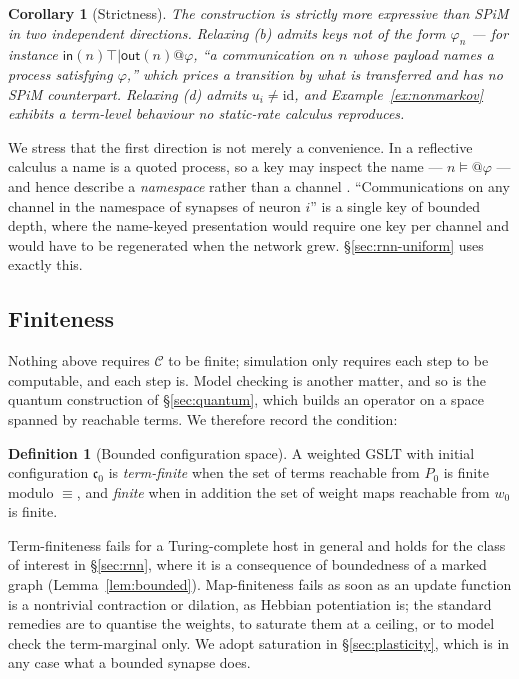 \documentclass[11pt,a4paper]{article}
\theoremstyle{plain}
\newtheorem{corollary}[theorem]{Corollary}
\theoremstyle{definition}
\newtheorem{definition}[theorem]{Definition}
\theoremstyle{remark}
\newcommand{\sepc}{\mathbin{\big|}}
\newcommand{\out}{\mathsf{out}}
\newcommand{\inn}{\mathsf{in}}
\newcommand{\Cfg}{\mathcal{C}}
\newcommand{\wmap}{w}
\begin{document}
\begin{corollary}[Strictness]
\label{cor:strict}
The construction is strictly more expressive than SPiM in two independent directions. Relaxing (b)
admits keys not of the form $\varphi_n$ --- for instance
$\inn(n)\top \sepc \out(n)@\varphi$, ``a communication on $n$ whose payload names a process
satisfying $\varphi$,'' which prices a transition by what is transferred and has no SPiM
counterpart. Relaxing (d) admits $u_i \neq \mathrm{id}$, and Example~\ref{ex:nonmarkov} exhibits a
term-level behaviour no static-rate calculus reproduces.
\end{corollary}

We stress that the first direction is not merely a convenience. In a reflective calculus a name is a
quoted process, so a key may inspect the name --- $n \models @\varphi$ --- and hence describe a
\emph{namespace} rather than a channel \cite{namespace}. ``Communications on any channel in the
namespace of synapses of neuron $i$'' is a single key of bounded depth, where the name-keyed
presentation would require one key per channel and would have to be regenerated when the network
grew. \S\ref{sec:rnn-uniform} uses exactly this.

\subsection{Finiteness}
\label{sec:finiteness}

Nothing above requires $\Cfg$ to be finite; simulation only requires each step to be computable, and
each step is. Model checking is another matter, and so is the quantum construction of
\S\ref{sec:quantum}, which builds an operator on a space spanned by reachable terms. We therefore
record the condition:

\begin{definition}[Bounded configuration space]
\label{def:bounded}
A weighted GSLT with initial configuration $\mathfrak{c}_0$ is \emph{term-finite} when the set of
terms reachable from $P_0$ is finite modulo $\equiv$, and \emph{finite} when in addition the set of
weight maps reachable from $\wmap_0$ is finite.
\end{definition}

Term-finiteness fails for a Turing-complete host in general and holds for the class of interest in
\S\ref{sec:rnn}, where it is a consequence of boundedness of a marked graph
(Lemma~\ref{lem:bounded}). Map-finiteness fails as soon as an update function is a nontrivial
contraction or dilation, as Hebbian potentiation is; the standard remedies are to quantise the
weights, to saturate them at a ceiling, or to model check the term-marginal only. We adopt
saturation in \S\ref{sec:plasticity}, which is in any case what a bounded synapse does.
\end{document}
